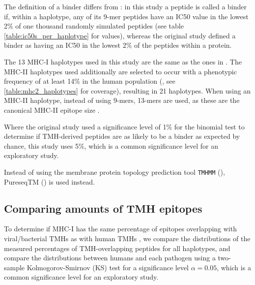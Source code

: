 The definition of a binder differs from \cite{bianchi2017}:
in this study a peptide is called a binder if, within a haplotype, 
any of its 9-mer peptides have an IC50 value in the lowest 2\% of 
one thousand randomly simulated 
peptides (see table \ref{table:ic50s_per_haplotype} for values), 
whereas the original study defined
a binder as having an IC50 in the lowest 2\% of the peptides within a protein.

The 13 MHC-I haplotypes used in this study are the same as 
the ones in \cite{bianchi2017}.
The MHC-II haplotypes used additionally are selected 
to occur with a phenotypic frequency of at least 
14\% in
the human population (\cite{greenbaum2011functional},
see \ref{table:mhc2_haplotypes} for coverage),
resulting in 21 haplotypes.
When using an MHC-II haplotype, instead of using 9-mers, 13-mers are
used, as these are the canonical MHC-II epitope size .

Where the original study used a significance level of 1\% 
for the binomial test to determine if TMH-derived peptides 
are as likely to be a binder as expected by chance, this study
uses 5\%, which is a common significance level for an exploratory study.

Instead of using the membrane protein topology prediction
tool \verb;TMHMM; (\cite{krogh2001predicting}), PureseqTM (\cite{wang2019efficient})
is used instead.

\subsection{Comparing amounts of TMH epitopes}

To determine if MHC-I has the same percentage of epitopes overlapping
with viral/bacterial TMHs as with human TMHs , 
we compare the distributions of the measured percentages 
of TMH-overlapping peptides for all haplotypes,
and compare the distributions between humans and each pathogen
using a two-sample Kolmogorov-Smirnov (KS) test
for a significance level $\alpha = 0.05$, 
which is a common significance level for an exploratory study.

